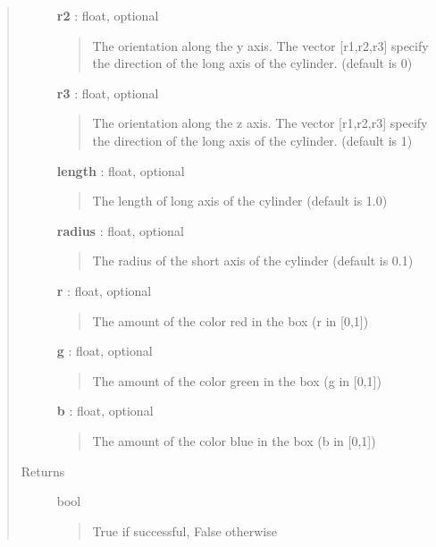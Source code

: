 \documentclass[letterpaper,10pt,english]{sphinxmanual}
\begin{document}
\begin{fulllineitems}
\begin{fulllineitems}
\begin{quote}
\begin{description}
\textbf{r2} : float, optional
\begin{quote}

The orientation along the y axis. The vector {[}r1,r2,r3{]}
specify the direction of the long axis of the cylinder.
(default is 0)
\end{quote}

\textbf{r3} : float, optional
\begin{quote}

The orientation along the z axis. The vector {[}r1,r2,r3{]}
specify the direction of the long axis of the cylinder.
(default is 1)
\end{quote}

\textbf{length} : float, optional
\begin{quote}

The length of long axis of the cylinder (default is 1.0)
\end{quote}

\textbf{radius} : float, optional
\begin{quote}

The radius of the short axis of the cylinder (default is 0.1)
\end{quote}

\textbf{r} : float, optional
\begin{quote}

The amount of the color red in the box (r in {[}0,1{]})
\end{quote}

\textbf{g} : float, optional
\begin{quote}

The amount of the color green in the box (g in {[}0,1{]})
\end{quote}

\textbf{b} : float, optional
\begin{quote}

The amount of the color blue in the box (b in {[}0,1{]})
\end{quote}

\item[{Returns}] \leavevmode
bool
\begin{quote}

True if successful, False otherwise
\end{quote}

\end{description}\end{quote}

\end{fulllineitems}


\end{fulllineitems}
\end{document}
